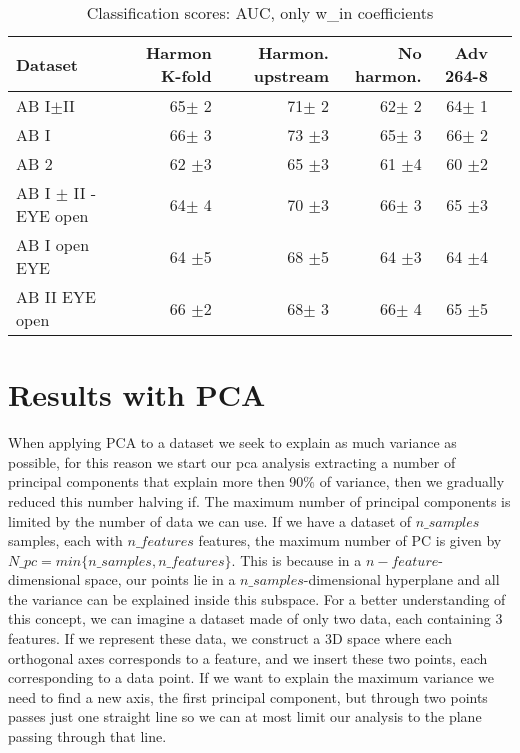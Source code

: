 \documentclass[10pt]{report}
\begin{document}
\begin{table}[!htp]\centering
\scriptsize
\begin{tabular}{lrrrrr}\toprule
Dataset &Harmon K-fold &Harmon. upstream &No harmon. &Adv 264-8 \\\midrule
AB I$\pm$II &65$\pm$ 2 &71$\pm$ 2 &62$\pm$ 2 &64$\pm$ 1 \\
AB I &66$\pm$ 3 &73 $\pm$3 &65$\pm$ 3 &66$\pm$ 2 \\
AB 2 &62 $\pm$3 &65 $\pm$3 &61 $\pm$4 &60 $\pm$2 \\
AB I $\pm$ II - EYE open &64$\pm$ 4 &70 $\pm$3 &66$\pm$ 3 &65 $\pm$3 \\
AB I open EYE &64 $\pm$5 &68 $\pm$5 &64 $\pm$3 &64 $\pm$4 \\
AB II EYE open &66 $\pm$2 &68$\pm$ 3 &66$\pm$ 4 &65 $\pm$5 \\
\bottomrule
\end{tabular}
\caption{Classification scores: AUC, only w\_in coefficients}\label{tab:classification_win}

\end{table}


\newpage

\section{Results with PCA}

When applying PCA to a dataset we seek to explain as much variance as possible, for this reason we start our pca analysis extracting a number of principal components that explain more then 90$\%$ of variance, then we gradually reduced this number halving if.
The maximum number of principal components is limited by the number of data we can use. If we have a dataset of $n\_samples$ samples, each with $n\_features$ features, the maximum number of PC is given by $N\_pc = min\{n\_samples, n\_features\}$.
This is because in a $n-feature$-dimensional space, our points lie in a $n\_samples$-dimensional hyperplane and all the variance can be explained inside this subspace.
For a better understanding of this concept, we can imagine a dataset made of only two data, each containing 3 features. If we represent these data, we construct a 3D space where each orthogonal axes corresponds to a feature, and we insert these two points, each corresponding to a data point.
If we want to explain the maximum variance we need to find a new axis, the first principal component, but through two points passes just one straight line so we can at most limit our analysis to the plane passing through that line.
\end{document}
